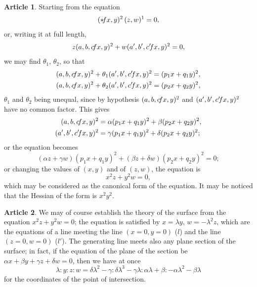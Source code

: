 \documentclass[12pt,a4paper]{article}
\theoremstyle{definition}
\newtheorem{art}{Article}[section]
\begin{document}
\begin{art}
Starting from the equation
\[
(* \hspace{-2pt} fx, y)^2 \, (z, w)^1 = 0,
\]
or, writing it at full length,
\[
z(a, b, c \hspace{-2pt} fx, y)^2 + w(a', b', c' \hspace{-2pt} fx, y)^2 = 0,
\]
we may find $\theta_1$, $\theta_2$, so that
\begin{align*}
(a, b, c \hspace{-2pt} fx, y)^2 + \theta_1 (a', b', c' \hspace{-2pt} fx, y)^2 &= (p_1 x + q_1 y)^2, \\
(a, b, c \hspace{-2pt} fx, y)^2 + \theta_2 (a', b', c' \hspace{-2pt} fx, y)^2 &= (p_2 x + q_2 y)^2,
\end{align*}
$\theta_1$ and $\theta_2$ being unequal, since by hypothesis $(a, b, c \hspace{-2pt} fx, y)^2$ and $(a', b', c' \hspace{-2pt} fx, y)^2$ have no common factor. This gives
\begin{align*}
(a, b, c \hspace{-2pt} fx, y)^2 &= \alpha (p_1 x + q_1 y)^2 + \beta (p_2 x + q_2 y)^2, \\
(a', b', c' \hspace{-2pt} fx, y)^2 &= \gamma (p_1 x + q_1 y)^2 + \delta (p_2 x + q_2 y)^2;
\end{align*}
or the equation becomes
\[
(\alpha z + \gamma w)(p_1 x + q_1 y)^2 + (\beta z + \delta w)(p_2 x + q_2 y)^2 = 0;
\]
or changing the values of $(x, y)$ and of $(z, w)$, the equation is
\[
x^2 z + y^2 w = 0,
\]
which may be considered as the canonical form of the equation. It may be noticed that the Hessian of the form is $x^2 y^2$.
\end{art}

\begin{art}
We may of course establish the theory of the surface from the equation $x^2 z + y^2 w = 0$; the equation is satisfied by $x = \lambda y$, $w = -\lambda^2 z$, which are the equations of a line meeting the line $(x = 0, y = 0)$ ($l$) and the line $(z = 0, w = 0)$ ($l'$). The generating line meets also any plane section of the surface; in fact, if the equation of the plane of the section be $\alpha x + \beta y + \gamma z + \delta w = 0$, then we have at once
\[
\lambda : y : z : w = \delta \lambda^2 - \gamma : \delta \lambda^3 - \gamma \lambda : \alpha \lambda + \beta : -\alpha \lambda^2 - \beta \lambda
\]
for the coordinates of the point of intersection.
\end{art}
\end{document}
